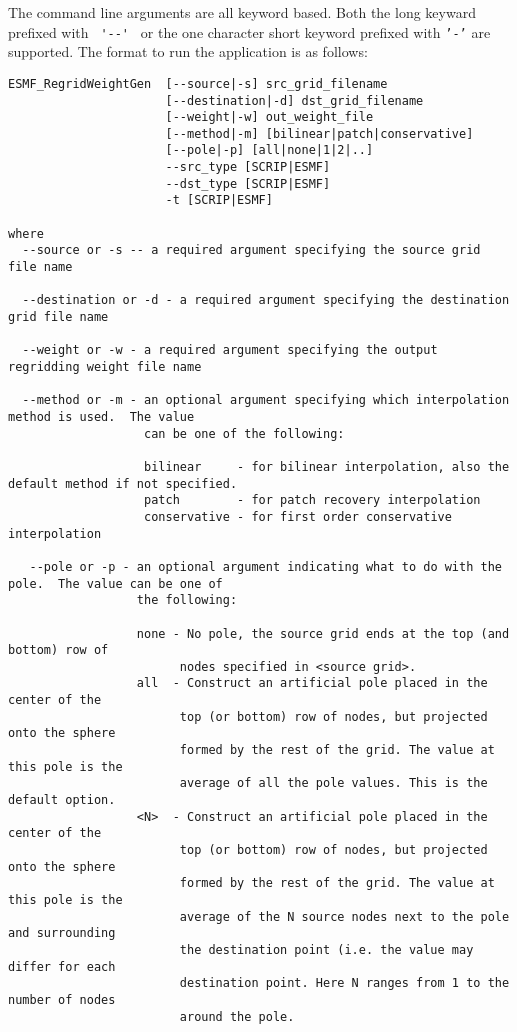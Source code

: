 The command line arguments are all keyword based.  Both the long keyward prefixed with \verb+ '--' + or the 
one character short keyword prefixed with {\tt '-'} are supported.  The format to run the application is 
as follows:

\begin{verbatim}
ESMF_RegridWeightGen  [--source|-s] src_grid_filename 
                      [--destination|-d] dst_grid_filename 
                      [--weight|-w] out_weight_file 
                      [--method|-m] [bilinear|patch|conservative] 
                      [--pole|-p] [all|none|1|2|..] 
                      --src_type [SCRIP|ESMF] 
                      --dst_type [SCRIP|ESMF]
                      -t [SCRIP|ESMF]

where
  --source or -s -- a required argument specifying the source grid file name

  --destination or -d - a required argument specifying the destination grid file name

  --weight or -w - a required argument specifying the output regridding weight file name

  --method or -m - an optional argument specifying which interpolation method is used.  The value
                   can be one of the following:

                   bilinear     - for bilinear interpolation, also the default method if not specified.
                   patch        - for patch recovery interpolation
                   conservative - for first order conservative interpolation

   --pole or -p - an optional argument indicating what to do with the pole.  The value can be one of
                  the following:

                  none - No pole, the source grid ends at the top (and bottom) row of 
                        nodes specified in <source grid>.
                  all  - Construct an artificial pole placed in the center of the 
                        top (or bottom) row of nodes, but projected onto the sphere 
                        formed by the rest of the grid. The value at this pole is the 
                        average of all the pole values. This is the default option.
                  <N>  - Construct an artificial pole placed in the center of the 
                        top (or bottom) row of nodes, but projected onto the sphere 
                        formed by the rest of the grid. The value at this pole is the 
                        average of the N source nodes next to the pole and surrounding
                        the destination point (i.e. the value may differ for each
                        destination point. Here N ranges from 1 to the number of nodes 
                        around the pole. 


\end{verbatim}
